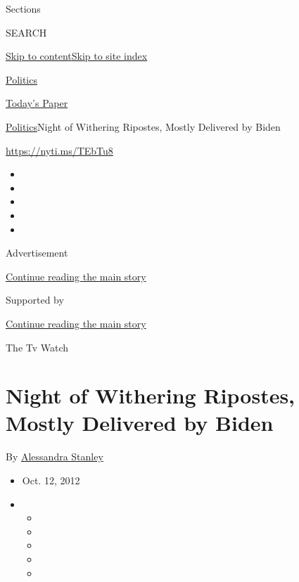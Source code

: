 Sections

SEARCH

\protect\hyperlink{site-content}{Skip to
content}\protect\hyperlink{site-index}{Skip to site index}

\href{https://www.nytimes.com/section/politics}{Politics}

\href{https://myaccount.nytimes.com/auth/login?response_type=cookie\&client_id=vi}{}

\href{https://www.nytimes.com/section/todayspaper}{Today's Paper}

\href{/section/politics}{Politics}\textbar{}Night of Withering Ripostes,
Mostly Delivered by Biden

\url{https://nyti.ms/TEbTu8}

\begin{itemize}
\item
\item
\item
\item
\item
\end{itemize}

Advertisement

\protect\hyperlink{after-top}{Continue reading the main story}

Supported by

\protect\hyperlink{after-sponsor}{Continue reading the main story}

The Tv Watch

\hypertarget{night-of-withering-ripostes-mostly-delivered-by-biden}{%
\section{Night of Withering Ripostes, Mostly Delivered by
Biden}\label{night-of-withering-ripostes-mostly-delivered-by-biden}}

By \href{https://www.nytimes.com/by/alessandra-stanley}{Alessandra
Stanley}

\begin{itemize}
\item
  Oct. 12, 2012
\item
  \begin{itemize}
  \item
  \item
  \item
  \item
  \item
  \end{itemize}
\end{itemize}

